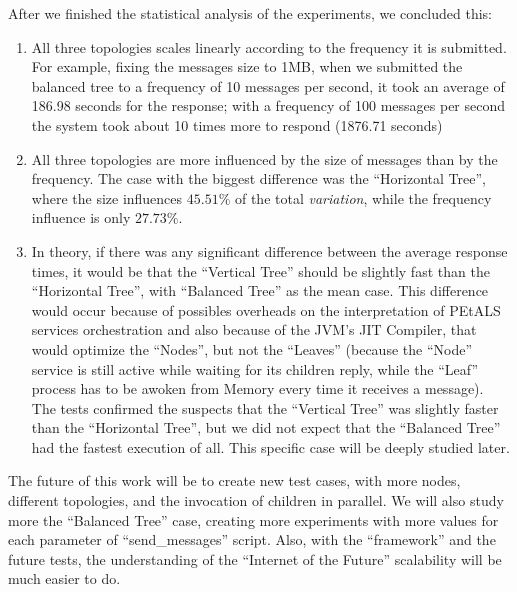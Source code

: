  
After we finished the statistical analysis of the experiments, we concluded this:
\begin{enumerate}
	\item All three topologies scales linearly according to the frequency it is submitted. For example, fixing the messages size to 1MB, when we submitted the balanced tree to a frequency of 10 messages per second, it took an average of 186.98 seconds for the response; with a frequency of 100 messages per second the system took about 10 times more to respond (1876.71 seconds)
	\item All three topologies are more influenced by the size of messages than by the frequency. The case with the biggest difference was the ``Horizontal Tree'', where the size influences $45.51\%$ of the total \emph{variation}, while the frequency influence is only $27.73\%$.
	\item In theory, if there was any significant difference between the average response times, it would be that the ``Vertical Tree'' should be slightly fast than the ``Horizontal Tree'', with ``Balanced Tree'' as the mean case. This difference would occur because of possibles overheads on the interpretation of PEtALS services orchestration and also because of the JVM's JIT Compiler, that would optimize the ``Nodes'', but not the ``Leaves'' (because the ``Node'' service is still active while waiting for its children reply, while the ``Leaf'' process has to be awoken from Memory every time it receives a message). The tests confirmed the suspects that the ``Vertical Tree'' was slightly faster than the ``Horizontal Tree'', but we did not expect that the ``Balanced Tree'' had the fastest execution of all. This specific case will be deeply studied later.
\end{enumerate}


The future of this work will be to create new test cases, with more nodes, different topologies, and the invocation of children in parallel. We will also study more the ``Balanced Tree'' case, creating more experiments with more values for each parameter of ``send_messages'' script. Also, with the ``framework'' and the future tests, the understanding of the ``Internet of the Future'' scalability will be much easier to do.